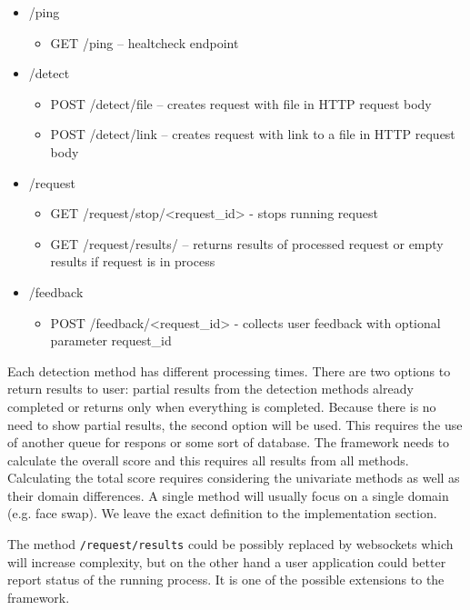 \begin{itemize}
\item /ping
    \begin{itemize}
    \item GET /ping – healtcheck endpoint
    \end{itemize}
\item /detect
    \begin{itemize}
    \item POST /detect/file – creates request with file in HTTP request body
    \item POST /detect/link – creates request with link to a file in HTTP request body
    \end{itemize}
\newpage
\item /request
    \begin{itemize}
    \item GET /request/stop/<request\_id> - stops running request
    \item GET /request/results/ – returns results of processed request or empty results if request is in process    
    \end{itemize}
\item /feedback
    \begin{itemize}
    \item POST /feedback/<request\_id> - collects user feedback with optional parameter request\_id
    \end{itemize}
\end{itemize}

Each detection method has different processing times. There are two options to return results to user: partial results from the detection methods already completed or returns only when everything is completed. Because there is no need to show partial results, the second option will be used. This requires the use of another queue for respons or some sort of database. The framework needs to calculate the overall score and this requires all results from all methods. Calculating the total score requires considering the univariate methods as well as their domain differences. A single method will usually focus on a single domain (e.g. face swap). We leave the exact definition to the implementation section.

The method \texttt{/request/results} could be possibly replaced by websockets which will increase complexity, but on the other hand a user application could better report status of the running process. It is one of the possible extensions to the framework.

